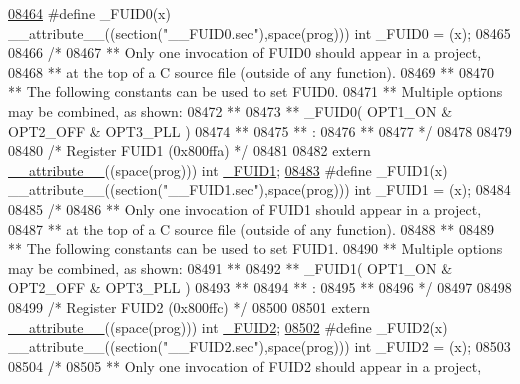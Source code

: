\begin{DoxyCode}
{{{{\hypertarget{a00009_source_l08464}{}\hyperlink{a00009_a8f1f7e736797ec125ac83da190ad1875}{08464} \textcolor{preprocessor}{#define \_FUID0(x) \_\_attribute\_\_((section("\_\_FUID0.sec"),space(prog))) int \_FUID0 = (x);}
08465 
08466 \textcolor{comment}{/*}
08467 \textcolor{comment}{** Only one invocation of FUID0 should appear in a project,}
08468 \textcolor{comment}{** at the top of a C source file (outside of any function).}
08469 \textcolor{comment}{**}
08470 \textcolor{comment}{** The following constants can be used to set FUID0.}
08471 \textcolor{comment}{** Multiple options may be combined, as shown:}
08472 \textcolor{comment}{**}
08473 \textcolor{comment}{** \_FUID0( OPT1\_ON & OPT2\_OFF & OPT3\_PLL )}
08474 \textcolor{comment}{**}
08475 \textcolor{comment}{**   :}
08476 \textcolor{comment}{**}
08477 \textcolor{comment}{*/}
08478 
08479 
08480 \textcolor{comment}{/* Register FUID1 (0x800ffa)                               */}
08481 
08482 \textcolor{keyword}{extern} \hyperlink{a00009_a493c46f03454991ccc5aa7a6e1dfb2a7}{\_\_attribute\_\_}((space(prog))) int \hyperlink{a00009_afe148acf23d7d7441a11da1e1eede2ae}{\_FUID1};
\hypertarget{a00009_source_l08483}{}\hyperlink{a00009_afe148acf23d7d7441a11da1e1eede2ae}{08483} \textcolor{preprocessor}{#define \_FUID1(x) \_\_attribute\_\_((section("\_\_FUID1.sec"),space(prog))) int \_FUID1 = (x);}
08484 
08485 \textcolor{comment}{/*}
08486 \textcolor{comment}{** Only one invocation of FUID1 should appear in a project,}
08487 \textcolor{comment}{** at the top of a C source file (outside of any function).}
08488 \textcolor{comment}{**}
08489 \textcolor{comment}{** The following constants can be used to set FUID1.}
08490 \textcolor{comment}{** Multiple options may be combined, as shown:}
08491 \textcolor{comment}{**}
08492 \textcolor{comment}{** \_FUID1( OPT1\_ON & OPT2\_OFF & OPT3\_PLL )}
08493 \textcolor{comment}{**}
08494 \textcolor{comment}{**   :}
08495 \textcolor{comment}{**}
08496 \textcolor{comment}{*/}
08497 
08498 
08499 \textcolor{comment}{/* Register FUID2 (0x800ffc)                               */}
08500 
08501 \textcolor{keyword}{extern} \hyperlink{a00009_a493c46f03454991ccc5aa7a6e1dfb2a7}{\_\_attribute\_\_}((space(prog))) int \hyperlink{a00009_a170e7798217d48d4583dc6e39eac810a}{\_FUID2};
\hypertarget{a00009_source_l08502}{}\hyperlink{a00009_a170e7798217d48d4583dc6e39eac810a}{08502} \textcolor{preprocessor}{#define \_FUID2(x) \_\_attribute\_\_((section("\_\_FUID2.sec"),space(prog))) int \_FUID2 = (x);}
08503 
08504 \textcolor{comment}{/*}
08505 \textcolor{comment}{** Only one invocation of FUID2 should appear in a project,}
}}}}
\end{DoxyCode}
